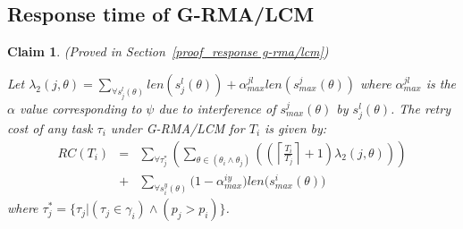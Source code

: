 \documentclass[conference]{sig-alternate}
\newtheorem{clm}{Claim}
\begin{document}

\subsection{Response time of G-RMA/LCM}
\label{rma}

\begin{clm}\label{response g-rma/lcm}
(Proved in Section~\ref{proof_response g-rma/lcm})

Let $\lambda_{2}(j,\theta)=\sum_{\forall s_{j}^{l}(\theta)}len(s_{j}^{l}(\theta))+\alpha_{max}^{jl}len(s_{max}^{j}(\theta))$ where $\alpha_{max}^{jl}$ is the $\alpha$ value corresponding to $\psi$ due to interference of $s_{max}^j(\theta)$ by $s_j^l(\theta)$. The retry cost of any task $\tau_i$ under G-RMA/LCM for $T_i$ is given by:
\begin{eqnarray}
RC\left(T_i\right) & = &
  \sum_{\forall \tau_{j}^{*}}\left(\sum_{\theta\in(\theta_{i}\wedge\theta_{j})}\left(\left(\left\lceil\frac{T_i}{T_{j}}\right\rceil +1\right)\lambda_{2}(j,\theta)\right)\right)\nonumber\\
& + & \sum_{\forall s_{i}^{y}(\theta)}\Big(1-\alpha_{max}^{iy}\Big)len\Big(s_{max}^i(\theta)\Big)
\label{eq60}
\end{eqnarray}
where $\tau_{j}^{*}=\{\tau_{j}|(\tau_{j}\in\gamma_{i})\wedge(p_{j}>p_{i})\}$.
\end{clm}
\end{document}
